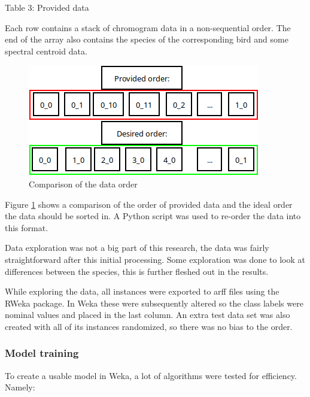 \documentclass[
]{article}
\begin{document}
\begin{center}
Table 3: Provided data \label{tab:tab3}
\end{center}

Each row contains a stack of chromogram data in a non-sequential order.
The end of the array also contains the species of the corresponding bird
and some spectral centroid data.

\begin{figure}
    \centering\includegraphics[width=\linewidth]{../figures/data_flow.png}
    \caption{Comparison of the data order}
    \label{fig:fig2}
\end{figure}

Figure \ref{fig:fig2} shows a comparison of the order of provided data
and the ideal order the data should be sorted in. A Python script was
used to re-order the data into this format.

Data exploration was not a big part of this research, the data was
fairly straightforward after this initial processing. Some exploration
was done to look at differences between the species, this is further
fleshed out in the results.

While exploring the data, all instances were exported to arff files
using the RWeka package. In Weka these were subsequently altered so the
class labels were nominal values and placed in the last column. An extra
test data set was also created with all of its instances randomized, so
there was no bias to the order.

\newpage

\hypertarget{model-training}{%
\subsubsection{Model training}\label{model-training}}

To create a usable model in Weka, a lot of algorithms were tested for
efficiency. Namely:
\end{document}
